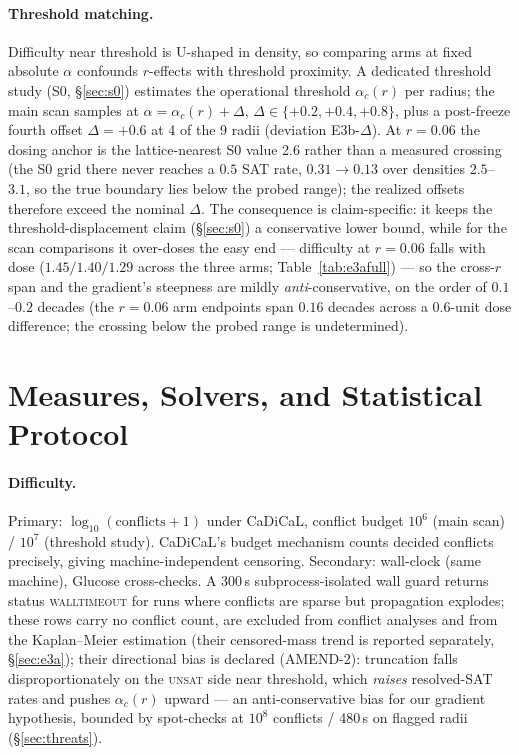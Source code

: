 \documentclass[manuscript, screen, review]{jair}
\newcommand{\ac}[1]{\ensuremath{\alpha_c(#1)}}
\begin{document}
\paragraph{Threshold matching.}
Difficulty near threshold is U-shaped in density, so comparing arms at fixed
absolute $\alpha$ confounds $r$-effects with threshold proximity. A dedicated
threshold study (S0, \S\ref{sec:s0}) estimates the operational threshold
$\ac{r}$ per radius; the main scan samples at $\alpha = \ac{r} + \Delta$,
$\Delta \in \{+0.2, +0.4, +0.8\}$, plus a post-freeze fourth offset
$\Delta{=}{+}0.6$ at 4 of the 9 radii (deviation E3b-$\Delta$). At $r{=}0.06$ the dosing anchor is the
lattice-nearest S0 value 2.6 rather than a measured crossing (the S0 grid
there never reaches a $0.5$ SAT rate, $0.31 \to 0.13$ over densities
$2.5$--$3.1$, so the true boundary lies below the probed range); the
realized offsets therefore exceed the nominal $\Delta$. The consequence is
claim-specific: it keeps the threshold-displacement claim
(\S\ref{sec:s0}) a conservative lower bound, while for the scan comparisons
it over-doses the easy end --- difficulty at $r{=}0.06$ falls with dose
($1.45/1.40/1.29$ across the three arms; Table~\ref{tab:e3afull}) --- so the
cross-$r$ span and the gradient's steepness are mildly
\emph{anti}-conservative, on the order of $0.1$--$0.2$ decades (the
$r{=}0.06$ arm endpoints span $0.16$ decades across a $0.6$-unit dose
difference; the crossing below the probed range is undetermined).

\section{Measures, Solvers, and Statistical Protocol}
\label{sec:method}

\paragraph{Difficulty.}
Primary: $\log_{10}(\text{conflicts}+1)$ under CaDiCaL, conflict budget
$10^6$ (main scan) / $10^7$ (threshold study). CaDiCaL's budget mechanism
counts decided conflicts precisely, giving machine-independent censoring.
Secondary: wall-clock (same machine), Glucose cross-checks. A 300\,s
subprocess-isolated wall guard returns status \textsc{walltimeout} for runs
where conflicts are sparse but propagation explodes; these rows carry no
conflict count, are excluded from conflict analyses and from the
Kaplan--Meier estimation (their censored-mass trend is reported separately,
\S\ref{sec:e3a}); their directional bias is declared (AMEND-2):
truncation falls disproportionately on the \textsc{unsat} side near
threshold, which \emph{raises} resolved-SAT rates and pushes $\ac{r}$ upward
--- an anti-conservative bias for our gradient hypothesis, bounded by
spot-checks at $10^8$ conflicts / 480\,s on flagged radii
(\S\ref{sec:threats}).
\end{document}
